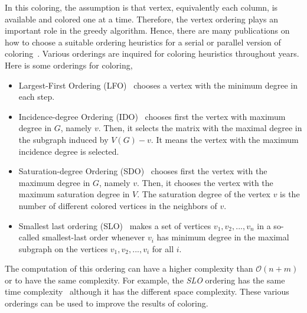 \documentclass[11pt, twoside,a4paper]{book}
\begin{document}
In this coloring, the assumption is that vertex,
equivalently each column, is available and colored one at a time.
Therefore, the vertex ordering plays an important role in the greedy algorithm.
Hence, there are many publications on how to choose
a suitable ordering heuristics for a serial or parallel version of
coloring~\cite{ordering1,ordering2,ordering3}.
Various orderings are inquired for coloring heuristics
throughout years. Here is some orderings for coloring,
\begin{itemize}
\item Largest-First Ordering (LFO)~\cite{LFO} chooses a vertex with the minimum degree in each step.
\item Incidence-degree Ordering (IDO)~\cite{IDO} chooses first the vertex with maximum degree in $G$, namely $v$. Then, it selects the matrix with the maximal degree in the subgraph induced by $V(G)-v$. It means the vertex with the maximum incidence degree is selected.
\item Saturation-degree Ordering (SDO)~\cite{SDO} chooses first the vertex with the maximum degree in $G$, namely $v$. Then, it chooses the vertex with the maximum saturation degree in
$V$. The saturation degree of the vertex $v$ is the number of different colored vertices in the neighbors of $v$.
\item Smallest last ordering (SLO)~\cite{ordering1} makes a set of vertices ${v_1,v_2,...,v_n}$ in a so-called smallest-last
order whenever $v_i$ has minimum degree in the maximal subgraph on the vertices $v_1,v_2,...,v_i$ for all $i$.
\end{itemize}
The computation of this ordering can have a higher complexity than $\mathcal{O}(n+m)$ or to have the same complexity. For example, the \textit{SLO} ordering has the same time complexity~\cite{ordering1} although it has the different space complexity.
These various orderings can be used to improve the results of coloring.
\end{document}
